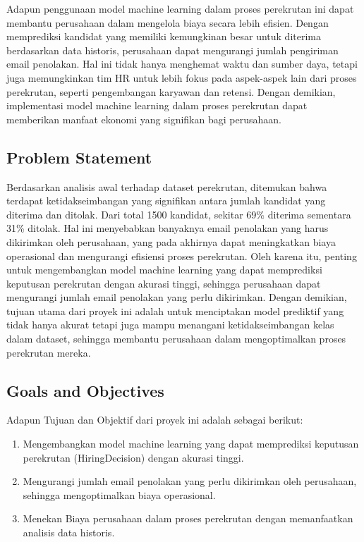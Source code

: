 Adapun penggunaan model machine learning dalam proses perekrutan ini dapat membantu perusahaan dalam mengelola biaya secara lebih efisien. Dengan memprediksi kandidat yang memiliki kemungkinan besar untuk diterima berdasarkan data historis, perusahaan dapat mengurangi jumlah pengiriman email penolakan. Hal ini tidak hanya menghemat waktu dan sumber daya, tetapi juga memungkinkan tim HR untuk lebih fokus pada aspek-aspek lain dari proses perekrutan, seperti pengembangan karyawan dan retensi. Dengan demikian, implementasi model machine learning dalam proses perekrutan dapat memberikan manfaat ekonomi yang signifikan bagi perusahaan.


\subsection{Problem Statement}


Berdasarkan analisis awal terhadap dataset perekrutan, ditemukan bahwa terdapat ketidakseimbangan yang signifikan antara jumlah kandidat yang diterima dan ditolak. Dari total 1500 kandidat, sekitar 69\% diterima sementara 31\% ditolak. Hal ini menyebabkan banyaknya email penolakan yang harus dikirimkan oleh perusahaan, yang pada akhirnya dapat meningkatkan biaya operasional dan mengurangi efisiensi proses perekrutan. Oleh karena itu, penting untuk mengembangkan model machine learning yang dapat memprediksi keputusan perekrutan dengan akurasi tinggi, sehingga perusahaan dapat mengurangi jumlah email penolakan yang perlu dikirimkan. Dengan demikian, tujuan utama dari proyek ini adalah untuk menciptakan model prediktif yang tidak hanya akurat tetapi juga mampu menangani ketidakseimbangan kelas dalam dataset, sehingga membantu perusahaan dalam mengoptimalkan proses perekrutan mereka.


\subsection{Goals and Objectives}
Adapun Tujuan dan Objektif dari proyek ini adalah sebagai berikut:

\begin{enumerate}
    \item Mengembangkan model machine learning yang dapat memprediksi keputusan perekrutan (HiringDecision) dengan akurasi tinggi.
    \item Mengurangi jumlah email penolakan yang perlu dikirimkan oleh perusahaan, sehingga mengoptimalkan biaya operasional.
    \item Menekan Biaya perusahaan dalam proses perekrutan dengan memanfaatkan analisis data historis.
\end{enumerate}


